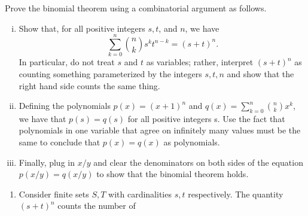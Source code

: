 \documentclass[12pt]{memoir}
\begin{document}
\begin{Ej}
Prove the binomial theorem using a combinatorial argument as follows.
\begin{enumerate}[i)]
    \itemsep=-0.4em
    \item Show that, for all positive integers $s, t$, and $n$, we have
    $$\sum_{k=0}^n\binom{n}{k}s^kt^{n-k}=(s+t)^n.$$
    In particular, do not treat $s$ and $t$ as variables; rather, interpret $(s+t)^n$ as counting something
    parameterized by the integers $s, t, n$ and show that the right hand side counts the same thing.
    \item Defining the polynomials $p(x) = (x + 1)^n$ and $q(x) = \sum_{k=0}^n\binom{n}{k}x^k$, we have that $p(s) = q(s)$
    for all positive integers s. Use the fact that polynomials in one variable that agree on infinitely many
    values must be the same to conclude that $p(x) = q(x)$ as polynomials.
    \item Finally, plug in $x/y$ and clear the denominators on both sides of the equation $p(x/y) = q(x/y)$ to show that the binomial theorem holds.
\end{enumerate}
\end{Ej}

\begin{ptcbr}
    \begin{enumerate}
        \itemsep=-0.4em
        \item 
        Consider finite sets $S,T$ with cardinalities $s,t$ respectively. The quantity $(s+t)^n$ counts the number of 
    \end{enumerate}
\end{ptcbr}
\end{document}
